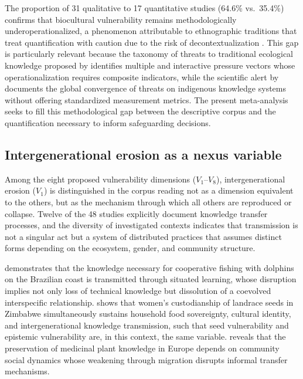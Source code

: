\documentclass[12pt,a4paper]{article}
\begin{document}
The proportion of 31 qualitative to 17 quantitative studies (64.6\% vs.\ 35.4\%) confirms that biocultural vulnerability remains methodologically underoperationalized, a phenomenon attributable to ethnographic traditions that treat quantification with caution due to the risk of decontextualization \citep{Agrawal2002}. This gap is particularly relevant because the taxonomy of threats to traditional ecological knowledge proposed by \citet{TangGavin2016} identifies multiple and interactive pressure vectors whose operationalization requires composite indicators, while the scientific alert by \citet{FernandezLlamazares2021} documents the global convergence of threats on indigenous knowledge systems without offering standardized measurement metrics. The present meta-analysis seeks to fill this methodological gap between the descriptive corpus and the quantification necessary to inform safeguarding decisions.

\subsection{Intergenerational erosion as a nexus variable}
\label{sec:dimensional-coverage}

Among the eight proposed vulnerability dimensions ($V_1$--$V_8$), intergenerational erosion ($V_1$) is distinguished in the corpus reading not as a dimension equivalent to the others, but as the mechanism through which all others are reproduced or collapse. Twelve of the 48 studies explicitly document knowledge transfer processes, and the diversity of investigated contexts indicates that transmission is not a singular act but a system of distributed practices that assumes distinct forms depending on the ecosystem, gender, and community structure.

\citet{Cantor2025} demonstrates that the knowledge necessary for cooperative fishing with dolphins on the Brazilian coast is transmitted through situated learning, whose disruption implies not only loss of technical knowledge but dissolution of a coevolved interspecific relationship. \citet{Sibanda2025} shows that women's custodianship of landrace seeds in Zimbabwe simultaneously sustains household food sovereignty, cultural identity, and intergenerational knowledge transmission, such that seed vulnerability and epistemic vulnerability are, in this context, the same variable. \citet{Gerner2025} reveals that the preservation of medicinal plant knowledge in Europe depends on community social dynamics whose weakening through migration disrupts informal transfer mechanisms.
\end{document}
